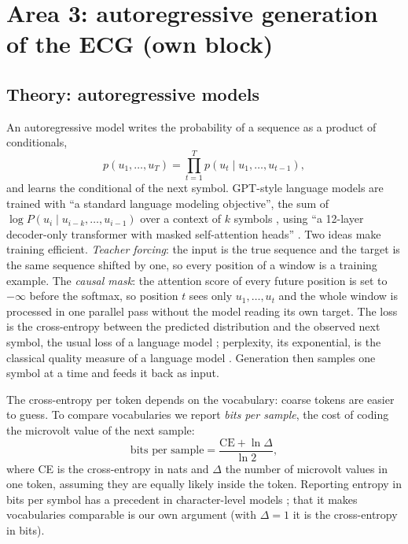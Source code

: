 \section{Area 3: autoregressive generation of the ECG (own block)}\label{sec:generative}

\subsection{Theory: autoregressive models}

An autoregressive model writes the probability of a sequence as a product of conditionals,
\begin{equation}
p(u_1,\dots,u_T) = \prod_{t=1}^{T} p(u_t \mid u_1,\dots,u_{t-1}),
\end{equation}
and learns the conditional of the next symbol. GPT-style language models are trained with ``a standard
language modeling objective'', the sum of $\log P(u_i \mid u_{i-k},\dots,u_{i-1})$ over a context of $k$
symbols \cite[p.~3]{radford2018improving}, using ``a 12-layer decoder-only transformer with masked
self-attention heads'' \cite[p.~5]{radford2018improving}. Two ideas make training efficient.
\emph{Teacher forcing}: the input is the true sequence and the target is the same sequence shifted by
one, so every position of a window is a training example. The \emph{causal mask}: the attention score of
every future position is set to $-\infty$ before the softmax, so position $t$ sees only $u_1,\dots,u_t$
and the whole window is processed in one parallel pass without the model reading its own target. The
loss is the cross-entropy between the predicted distribution and the observed next symbol, the usual
loss of a language model \cite[p.~3]{chelba2017ngram}; perplexity, its exponential, is the classical
quality measure of a language model \cite[p.~2]{chelba2017ngram}. Generation then samples one symbol at
a time and feeds it back as input.

The cross-entropy per token depends on the vocabulary: coarse tokens are easier to guess. To compare
vocabularies we report \emph{bits per sample}, the cost of coding the microvolt value of the next
sample:
\begin{equation}
\text{bits per sample} = \frac{\mathrm{CE} + \ln \Delta}{\ln 2},
\end{equation}
where CE is the cross-entropy in nats and $\Delta$ the number of microvolt values in one token,
assuming they are equally likely inside the token. Reporting entropy in bits per symbol has a
precedent in character-level models \cite[p.~8]{pascanu2013difficulty}; that it makes vocabularies
comparable is our own argument (with $\Delta = 1$ it is the cross-entropy in bits).

